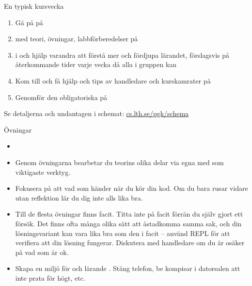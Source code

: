 \fi %

\begin{Slide}{En typisk kursvecka}
\begin{enumerate}
\item Gå på  på 
\item {}  med teori, övningar, labbförberedelser på  
\item {} i  och hjälp varandra att förstå mer och fördjupa lärandet, förslagsvis på återkommande tider varje vecka då alla i gruppen kan
\item Kom till  och få hjälp och tips av handledare och kurskamrater på 
\item Genomför den obligatoriska  på 
\end{enumerate}
Se detaljerna och undantagen i schemat: \href{http://cs.lth.se/pgk/schema}{cs.lth.se/pgk/schema}
\end{Slide}

\ifkompendium\else  %
\begin{Slide}{Övningar}\SlideFontSmall
\begin{itemize}
  \item {}

\item Genom övningarna bearbetar du teorins olika delar via egna  med  som viktigaste verktyg.

\item Fokusera på att  vad som händer när du kör din kod. Om du bara rusar vidare utan reflektion lär du dig inte alls lika bra.

\item Till de flesta övningar finns facit. Titta inte på facit förrän du själv gjort ett försök. Det finns ofta många olika sätt att åstadkomma samma sak, och din lösningsvariant kan vara lika bra som den i facit -- använd REPL för att verifiera att din lösning fungerar. Diskutera med handledare om du är osäker på vad som är ok.

\item Skapa en miljö för  och lärande . Stäng telefon, be kompisar i datorsalen att inte prata för högt, etc.
\end{itemize}
\end{Slide}

